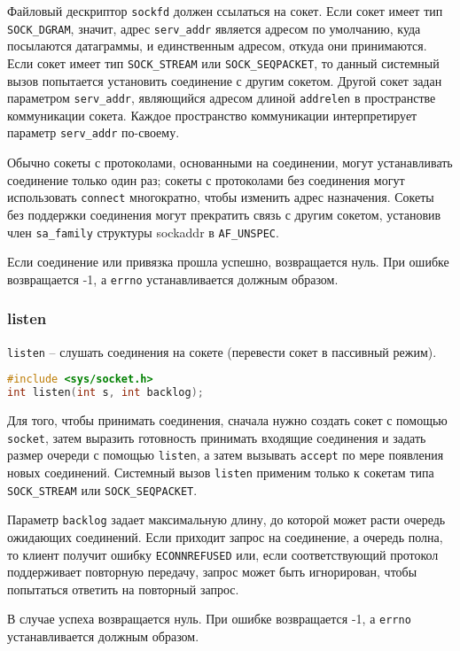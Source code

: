 Файловый дескриптор {\tt sockfd} должен ссылаться на сокет. 
Если сокет имеет тип {\tt SOCK\_DGRAM}, значит, адрес {\tt serv\_addr} является 
адресом по умолчанию, куда посылаются датаграммы, и единственным адресом, откуда 
они принимаются. Если сокет имеет тип {\tt SOCK\_STREAM} или {\tt SOCK\_SEQPACKET},
то данный системный вызов попытается установить соединение с другим сокетом.
Другой сокет задан параметром {\tt serv\_addr}, являющийся адресом длиной 
{\tt addrelen} в пространстве коммуникации сокета. Каждое пространство коммуникации 
интерпретирует параметр {\tt serv\_addr} по-своему.

Обычно сокеты с протоколами, основанными на соединении, могут устанавливать 
соединение только один раз; сокеты с протоколами без соединения могут 
использовать {\tt connect} многократно, чтобы изменить адрес назначения. 
Сокеты без поддержки соединения могут прекратить связь с другим сокетом, 
установив член {\tt sa\_family} структуры sockaddr в {\tt AF\_UNSPEC}.

Если соединение или привязка прошла успешно, возвращается нуль. 
При ошибке возвращается -1, а {\tt errno} устанавливается должным образом.

\subsubsection{listen}
{\tt listen} -- слушать соединения на сокете (перевести сокет в пассивный режим).

\begin{lstlisting}[language=C]
#include <sys/socket.h> 
int listen(int s, int backlog);   
\end{lstlisting}

Для того, чтобы принимать соединения, сначала нужно создать сокет с 
помощью {\tt socket}, затем выразить готовность принимать входящие соединения 
и задать размер очереди с помощью {\tt listen}, а затем вызывать {\tt accept} 
по мере появления новых соединений. Системный вызов {\tt listen} применим 
только к сокетам типа {\tt SOCK\_STREAM} или {\tt SOCK\_SEQPACKET}.

Параметр {\tt backlog} задает максимальную длину, до которой может расти очередь 
ожидающих соединений. Если приходит запрос на соединение, а очередь полна,
то клиент получит ошибку {\tt ECONNREFUSED} или, если соответствующий
протокол поддерживает повторную передачу, запрос может быть игнорирован,
чтобы попытаться ответить на повторный запрос.   

В случае успеха возвращается нуль. 
При ошибке возвращается -1, а {\tt errno} устанавливается должным образом.

